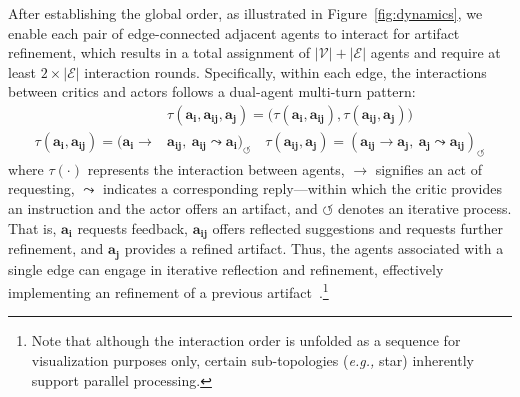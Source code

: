 \documentclass{article}
\newcommand{\eg}{\textit{e.g., }}
\begin{document}
After establishing the global order, as illustrated in Figure~\ref{fig:dynamics}, we enable each pair of edge-connected adjacent agents to interact for artifact refinement, which results in a total assignment of \(|\mathcal{V}| + |\mathcal{E}|\) agents and require at least \(2 \times |\mathcal{E}|\) interaction rounds. Specifically, within each edge, the interactions between critics and actors follows a dual-agent multi-turn  pattern:
\begin{equation}
\begin{aligned}
& \tau(\bm{a_{i}, \bm{a_{ij}}}, \bm{a_{j}}) = \big( \tau(\bm{a_{i}, \bm{a_{ij}}}), \tau(\bm{a_{ij}}, \bm{a_{j}}) \big) \\
\tau(\bm{a_{i}, \bm{a_{ij}}}) = ( \bm{a_{i}} \rightarrow&  \bm{a_{ij}}, \ \bm{a_{ij}} \leadsto \bm{a_{i}} )_{\circlearrowleft} \quad 
\tau(\bm{a_{ij}}, \bm{a_{j}}) = ( \bm{a_{ij}}\rightarrow \bm{a_{j}}, \ \bm{a_{j}} \leadsto \bm{a_{ij}} )_{\circlearrowleft}
\end{aligned}
\end{equation}
where $\tau(\cdot)$ represents the interaction between agents, $\rightarrow$ signifies an act of requesting, $\leadsto$ indicates a corresponding reply—within which the critic provides an instruction and the actor offers an artifact, and $\circlearrowleft$ denotes an iterative process.
That is, \(\bm{a_{i}}\) requests feedback, \(\bm{a_{ij}}\) offers reflected suggestions and requests further refinement, and \(\bm{a_{j}}\) provides a refined artifact. 
Thus, the agents associated with a single edge can engage in iterative reflection and refinement, effectively implementing an refinement of a previous artifact~\citep{Madaan2023Self,Renze2024Self}.\footnote{Note that although the interaction order is unfolded as a sequence for visualization purposes only, certain sub-topologies (\eg star) inherently support parallel processing.}
\end{document}
